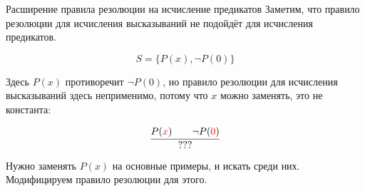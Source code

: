 \documentclass[handout]{beamer}
\begin{document}
\begin{frame}{Расширение правила резолюции на исчисление предикатов}
Заметим, что правило резолюции для исчисления высказываний не подойдёт для исчисления предикатов.

$$S = \{ P(x), \neg P(0)\}$$

Здесь $P(x)$ противоречит $\neg P(0)$, но правило резолюции для исчисления высказываний здесь неприменимо, потому
что $x$ можно заменять, это не константа:

$$\infer{???}{P({\color{red}x})\quad\quad\neg P({\color{red}0})}$$

Нужно заменять $P(x)$ на основные примеры, и искать среди них. Модифицируем правило резолюции для этого.

\end{frame}
\end{document}
